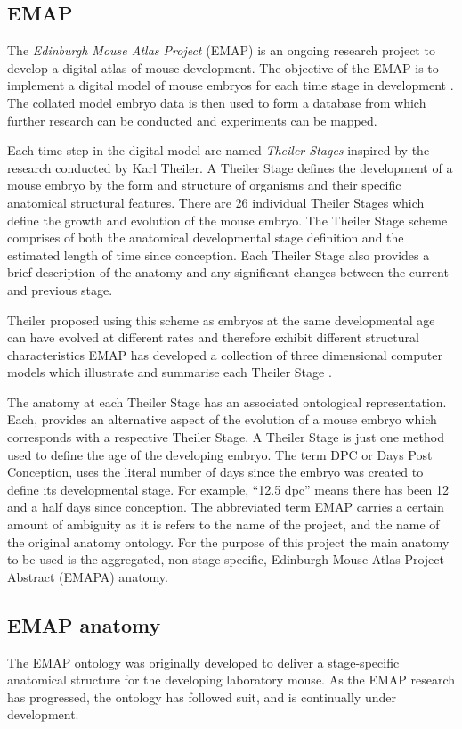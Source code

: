 \subsection{EMAP}
The \textit{Edinburgh Mouse Atlas Project} (EMAP) is an ongoing research project to develop a digital atlas of mouse development. The objective of the EMAP is to implement a digital model of mouse embryos for each time stage in development \cite{emap}. The collated model embryo data is then used to form a database from which further research can be conducted and experiments can be mapped.
 
Each time step in the digital model are named \textit{Theiler Stages} inspired by the research conducted by Karl Theiler. A Theiler Stage defines the development of a mouse embryo by the form and structure of organisms and their specific anatomical structural features. There are 26 individual Theiler Stages which define the growth and evolution of the mouse embryo. The Theiler Stage scheme comprises of both the anatomical developmental stage definition and the estimated length of time since conception. Each Theiler Stage also provides a brief description of the anatomy and any significant changes between the current and previous stage.

Theiler proposed using this scheme as embryos at the same developmental age can have evolved at different rates and therefore exhibit different structural characteristics  EMAP has developed a collection of three dimensional computer models which illustrate and summarise each Theiler Stage \cite{emap}.

The anatomy at each Theiler Stage has an associated ontological representation. Each, provides an alternative aspect of the evolution of a mouse embryo which corresponds with a respective Theiler Stage. A Theiler Stage is just one method used to define the age of the developing embryo. The term DPC or Days Post Conception, uses the literal number of days since the embryo was created to define its developmental stage. For example, ``12.5 dpc'' means there has been 12 and a half days since conception. The abbreviated term EMAP carries a certain amount of ambiguity as it is refers to the name of the project, and the name of the original anatomy ontology. For the purpose of this project the main anatomy to be used is the aggregated, non-stage specific, Edinburgh Mouse Atlas Project Abstract (EMAPA) anatomy.

\subsection{EMAP anatomy}
The EMAP ontology was originally developed to deliver a stage-specific anatomical structure for the developing laboratory mouse. As the EMAP research has progressed, the ontology has followed suit, and is continually under development.

